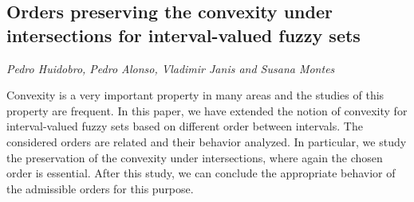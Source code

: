 \documentclass[../booklet.tex]{subfiles}
\begin{document}
\subsection[Orders preserving the convexity under intersections for interval-valued fuzzy sets. {\it Pedro Huidobro, Pedro Alonso, Vladimir Janis and Susana Montes}]{Orders preserving the convexity under intersections for interval-valued fuzzy sets}
   

\begin{center}
  {\it Pedro Huidobro, Pedro Alonso, Vladimir Janis and Susana Montes}
\end{center}



Convexity is a very important property in many areas and the studies of this property are frequent. In this paper, we have extended the notion of convexity for interval-valued fuzzy sets based on different order between intervals. The considered orders are related and their behavior analyzed. In particular, we study the preservation of the convexity under intersections, where again the chosen order is essential. After this study, we can conclude the appropriate behavior of the admissible orders for this purpose.

\end{document}
